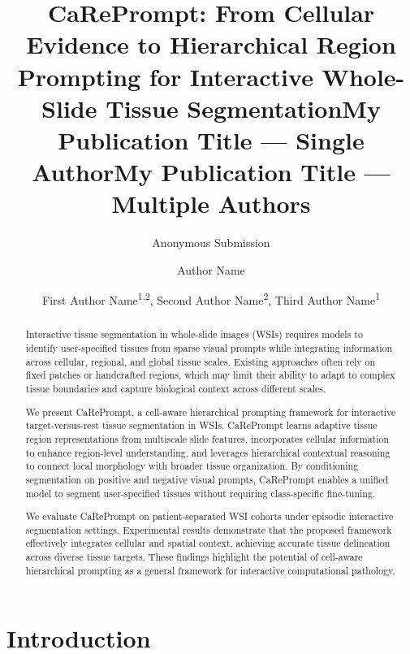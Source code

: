 \documentclass[letterpaper]{article} %
\title{CaRePrompt: From Cellular Evidence to Hierarchical Region Prompting for Interactive Whole-Slide Tissue Segmentation}
\author{Anonymous Submission}
\title{My Publication Title --- Single Author}
\author{
    Author Name
}
\title{My Publication Title --- Multiple Authors}
\author{
    First Author Name\textsuperscript{\rm 1,\rm 2}\equalcontrib,
    Second Author Name\textsuperscript{\rm 2}\equalcontrib,
    Third Author Name\textsuperscript{\rm 1}\corresponding
}
\begin{document}
\maketitle

\begin{abstract}
Interactive tissue segmentation in whole-slide images (WSIs) requires models to identify user-specified tissues from sparse visual prompts while integrating information across cellular, regional, and global tissue scales. Existing approaches often rely on fixed patches or handcrafted regions, which may limit their ability to adapt to complex tissue boundaries and capture biological context across different scales.

We present CaRePrompt, a cell-aware hierarchical prompting framework for interactive target-versus-rest tissue segmentation in WSIs. CaRePrompt learns adaptive tissue region representations from multiscale slide features, incorporates cellular information to enhance region-level understanding, and leverages hierarchical contextual reasoning to connect local morphology with broader tissue organization. By conditioning segmentation on positive and negative visual prompts, CaRePrompt enables a unified model to segment user-specified tissues without requiring class-specific fine-tuning.

We evaluate CaRePrompt on patient-separated WSI cohorts under episodic interactive segmentation settings. Experimental results demonstrate that the proposed framework effectively integrates cellular and spatial context, achieving accurate tissue delineation across diverse tissue targets. These findings highlight the potential of cell-aware hierarchical prompting as a general framework for interactive computational pathology.
\end{abstract}


\section{Introduction}
\end{document}
